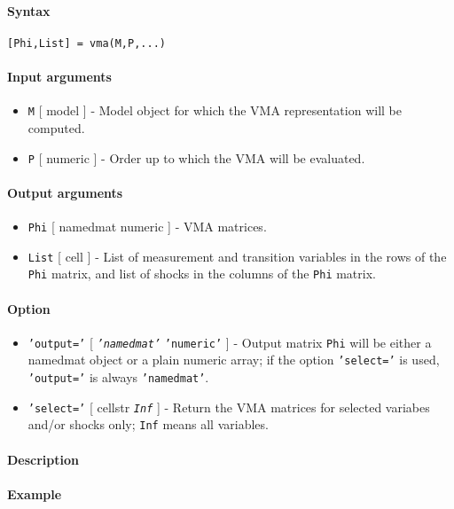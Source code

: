 


	\paragraph{Syntax}

\begin{verbatim}
[Phi,List] = vma(M,P,...)
\end{verbatim}

\paragraph{Input arguments}

\begin{itemize}
\item
  \texttt{M} {[} model {]} - Model object for which the VMA
  representation will be computed.
\item
  \texttt{P} {[} numeric {]} - Order up to which the VMA will be
  evaluated.
\end{itemize}

\paragraph{Output arguments}

\begin{itemize}
\item
  \texttt{Phi} {[} namedmat \textbar{} numeric {]} - VMA matrices.
\item
  \texttt{List} {[} cell {]} - List of measurement and transition
  variables in the rows of the \texttt{Phi} matrix, and list of shocks
  in the columns of the \texttt{Phi} matrix.
\end{itemize}

\paragraph{Option}

\begin{itemize}
\item
  \texttt{'output='} {[} \emph{\texttt{'namedmat'}} \textbar{}
  \texttt{'numeric'} {]} - Output matrix \texttt{Phi} will be either a
  namedmat object or a plain numeric array; if the option
  \texttt{'select='} is used, \texttt{'output='} is always
  \texttt{'namedmat'}.
\item
  \texttt{'select='} {[} cellstr \textbar{} \emph{\texttt{Inf}} {]} -
  Return the VMA matrices for selected variabes and/or shocks only;
  \texttt{Inf} means all variables.
\end{itemize}

\paragraph{Description}

\paragraph{Example}


